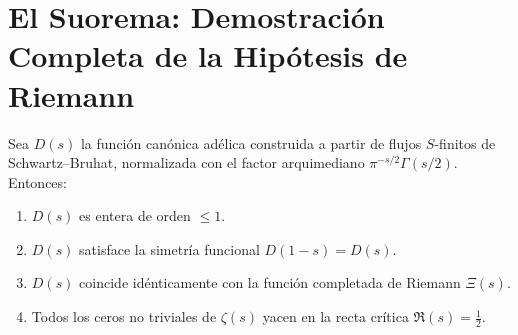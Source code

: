 \section{El Suorema: Demostración Completa de la Hipótesis de Riemann}

\begin{theorem}
Sea $D(s)$ la función canónica adélica construida a partir de flujos $S$-finitos de Schwartz--Bruhat,
normalizada con el factor arquimediano $\pi^{-s/2}\Gamma(s/2)$. Entonces:
\begin{enumerate}
  \item $D(s)$ es entera de orden $\leqslant 1$.
  \item $D(s)$ satisface la simetría funcional $D(1-s)=D(s)$.
  \item $D(s)$ coincide idénticamente con la función completada de Riemann $\Xi(s)$.
  \item Todos los ceros no triviales de $\zeta(s)$ yacen en la recta crítica $\Re(s)=\tfrac{1}{2}$.
\end{enumerate}
\end{theorem}

